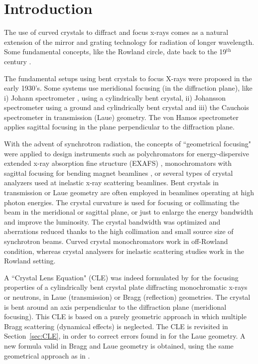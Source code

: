 \documentclass[preprint]{iucr}              %
\begin{document}
\section{Introduction}

The use of curved crystals to diffract and focus x-rays comes as a natural extension of the mirror and grating technology for radiation of longer wavelength. Some fundamental concepts, like the Rowland circle, date back to the 19$^\text{th}$ century \cite{rowland1882}.

The fundamental setups using bent crystals to focus X-rays were proposed in the early 1930’s. Some systems use meridional focusing (in the diffraction plane), like i) Johann spectrometer \cite{Johann1931}, using a cylindrically bent crystal,  ii) Johansson spectrometer \cite{Johansson1933} using a ground and cylindrically bent crystal and iii) the Cauchois spectrometer \cite{cauchois1933} in transmission (Laue) geometry. The von Hamos spectrometer \cite{V.Hamos1933} applies sagittal focusing in the plane perpendicular to the diffraction plane.

With the advent of synchrotron radiation, the concepts of ``geometrical focusing" were applied to design instruments such as polychromators for energy-dispersive extended x-ray absorption fine structure (EXAFS) \cite{Tolentino:ms0206}, monochromators with sagittal focusing for bending magnet beamlines \cite{Sparks1980}, or several types of crystal analyzers used at inelastic x-ray scattering beamlines. Bent crystals in transmission or Laue geometry are often employed in beamlines operating at high photon energies. The crystal curvature is used for focusing or collimating the beam in the meridional \cite{Suortti1988,SuorttiShulze} or sagittal \cite{Zhong2001} plane, or just to enlarge the energy bandwidth and improve the luminosity. The crystal bandwidth was optimized and aberrations reduced thanks to the high collimation and small source size of synchrotron beams. Curved crystal monochromators work in off-Rowland condition, whereas crystal analysers for inelastic scattering studies work in the Rowland setting.

A ``Crystal Lens Equation" (CLE) was indeed formulated by \cite{CK} for the focusing properties of a cylindrically bent crystal plate diffracting monochromatic x-rays or neutrons, in Laue (transmission) or Bragg (reflection) geometries. The crystal is bent around an axis perpendicular to the diffraction plane (meridional focusing). This CLE is based on a purely geometric approach in which multiple Bragg scattering (dynamical effects) is neglected. 
The CLE is revisited in Section~\ref{sec:CLE}, in order to correct errors found in \cite{CK} for the Laue geometry. A new formula valid in Bragg and Laue geometry is obtained, using the same geometrical approach as in \cite{CK}.
\end{document}
